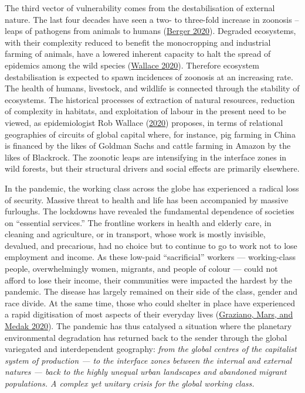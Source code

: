 \documentclass[a4paper, nobind]{templates/ociamthesis}
\begin{document}
The third vector of vulnerability comes from the destabilisation of external nature. The last four decades have seen a two- to three-fold increase in zoonosis -- leaps of pathogens from animals to humans (\protect\hyperlink{ref-berger_man_2020}{Berger 2020}). Degraded ecosystems, with their complexity reduced to benefit the monocropping and industrial farming of animals, have a lowered inherent capacity to halt the spread of epidemics among the wild species (\protect\hyperlink{ref-wallace_dead_2020}{Wallace 2020}). Therefore ecosystem destabilisation is expected to spawn incidences of zoonosis at an increasing rate. The health of humans, livestock, and wildlife is connected through the stability of ecosystems. The historical processes of extraction of natural resources, reduction of complexity in habitats, and exploitation of labour in the present need to be viewed, as epidemiologist Rob Wallace (\protect\hyperlink{ref-wallace_dead_2020}{2020}) proposes, in terms of relational geographies of circuits of global capital where, for instance, pig farming in China is financed by the likes of Goldman Sachs and cattle farming in Amazon by the likes of Blackrock. The zoonotic leaps are intensifying in the interface zones in wild forests, but their structural drivers and social effects are primarily elsewhere.

In the pandemic, the working class across the globe has experienced a radical loss of security. Massive threat to health and life has been accompanied by massive furloughs. The lockdowns have revealed the fundamental dependence of societies on ``essential services.'' The frontline workers in health and elderly care, in cleaning and agriculture, or in transport, whose work is mostly invisible, devalued, and precarious, had no choice but to continue to go to work not to lose employment and income. As these low-paid ``sacrificial'' workers --- working-class people, overwhelmingly women, migrants, and people of colour --- could not afford to lose their income, their communities were impacted the hardest by the pandemic. The disease has largely remained on their side of the class, gender and race divide. At the same time, those who could shelter in place have experienced a rapid digitisation of most aspects of their everyday lives (\protect\hyperlink{ref-graziano_care_2020}{Graziano, Mars, and Medak 2020}). The pandemic has thus catalysed a situation where the planetary environmental degradation has returned back to the sender through the global variegated and interdependent geography: \emph{from the global centres of the capitalist system of production --- to the interface zones between the internal and external natures --- back to the highly unequal urban landscapes and abandoned migrant populations. A complex yet unitary crisis for the global working class.}
\end{document}
